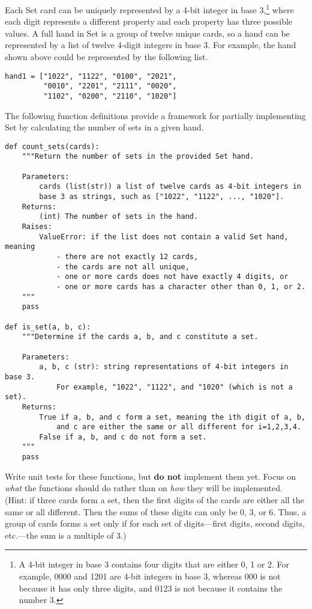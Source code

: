 \begin{problem}
Each Set card can be uniquely represented by a 4-bit integer in base 3,\footnote{A 4-bit integer in base 3 contains four digits that are either 0, 1 or 2. For example, 0000 and 1201 are 4-bit integers in base 3, whereas 000 is not because it has only three digits, and 0123 is not because it contains the number 3.} where each digit represents a different property and each property has three possible values.
A full hand in Set is a group of twelve unique cards, so a hand can be represented by a list of twelve 4-digit integers in base 3.
For example, the hand shown above could be represented by the following list.

\begin{lstlisting}
hand1 = ["1022", "1122", "0100", "2021",
         "0010", "2201", "2111", "0020",
         "1102", "0200", "2110", "1020"]
\end{lstlisting}

The following function definitions provide a framework for partially implementing Set by calculating the number of sets in a given hand. %

\newpage

\begin{lstlisting}
def count_sets(cards):
    """Return the number of sets in the provided Set hand.

    Parameters:
        cards (list(str)) a list of twelve cards as 4-bit integers in
        base 3 as strings, such as ["1022", "1122", ..., "1020"].
    Returns:
        (int) The number of sets in the hand.
    Raises:
        ValueError: if the list does not contain a valid Set hand, meaning
            - there are not exactly 12 cards,
            - the cards are not all unique,
            - one or more cards does not have exactly 4 digits, or
            - one or more cards has a character other than 0, 1, or 2.
    """
    pass

def is_set(a, b, c):
    """Determine if the cards a, b, and c constitute a set.

    Parameters:
        a, b, c (str): string representations of 4-bit integers in base 3.
            For example, "1022", "1122", and "1020" (which is not a set).
    Returns:
        True if a, b, and c form a set, meaning the ith digit of a, b,
            and c are either the same or all different for i=1,2,3,4.
        False if a, b, and c do not form a set.
    """
    pass
\end{lstlisting}

Write unit tests for these functions, but \textbf{do not} implement them yet.
Focus on \emph{what} the functions should do rather than on \emph{how} they will be implemented.
\\ (Hint: if three cards form a set, then the first digits of the cards are either all the same or all different.
Then the sums of these digits can only be 0, 3, or 6.
Thus, a group of cards forms a set only if for each set of digits---first digits, second digits, etc.---the sum is a multiple of 3.)
\label{prob:tdd_tests}
\end{problem}

